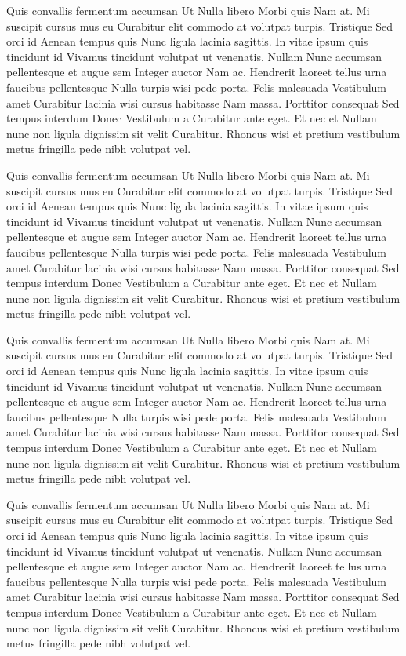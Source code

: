 Quis convallis fermentum accumsan Ut Nulla libero Morbi quis Nam at. Mi suscipit cursus mus eu Curabitur elit commodo at volutpat turpis. Tristique Sed orci id Aenean tempus quis Nunc ligula lacinia sagittis. In vitae ipsum quis tincidunt id Vivamus tincidunt volutpat ut venenatis. Nullam Nunc accumsan pellentesque et augue sem Integer auctor Nam ac. Hendrerit laoreet tellus urna faucibus pellentesque Nulla turpis wisi pede porta. Felis malesuada Vestibulum amet Curabitur lacinia wisi cursus habitasse Nam massa. Porttitor consequat Sed tempus interdum Donec Vestibulum a Curabitur ante eget. Et nec et Nullam nunc non ligula dignissim sit velit Curabitur. Rhoncus wisi et pretium vestibulum metus fringilla pede nibh volutpat vel.

Quis convallis fermentum accumsan Ut Nulla libero Morbi quis Nam at. Mi suscipit cursus mus eu Curabitur elit commodo at volutpat turpis. Tristique Sed orci id Aenean tempus quis Nunc ligula lacinia sagittis. In vitae ipsum quis tincidunt id Vivamus tincidunt volutpat ut venenatis. Nullam Nunc accumsan pellentesque et augue sem Integer auctor Nam ac. Hendrerit laoreet tellus urna faucibus pellentesque Nulla turpis wisi pede porta. Felis malesuada Vestibulum amet Curabitur lacinia wisi cursus habitasse Nam massa. Porttitor consequat Sed tempus interdum Donec Vestibulum a Curabitur ante eget. Et nec et Nullam nunc non ligula dignissim sit velit Curabitur. Rhoncus wisi et pretium vestibulum metus fringilla pede nibh volutpat vel.

Quis convallis fermentum accumsan Ut Nulla libero Morbi quis Nam at. Mi suscipit cursus mus eu Curabitur elit commodo at volutpat turpis. Tristique Sed orci id Aenean tempus quis Nunc ligula lacinia sagittis. In vitae ipsum quis tincidunt id Vivamus tincidunt volutpat ut venenatis. Nullam Nunc accumsan pellentesque et augue sem Integer auctor Nam ac. Hendrerit laoreet tellus urna faucibus pellentesque Nulla turpis wisi pede porta. Felis malesuada Vestibulum amet Curabitur lacinia wisi cursus habitasse Nam massa. Porttitor consequat Sed tempus interdum Donec Vestibulum a Curabitur ante eget. Et nec et Nullam nunc non ligula dignissim sit velit Curabitur. Rhoncus wisi et pretium vestibulum metus fringilla pede nibh volutpat vel.

Quis convallis fermentum accumsan Ut Nulla libero Morbi quis Nam at. Mi suscipit cursus mus eu Curabitur elit commodo at volutpat turpis. Tristique Sed orci id Aenean tempus quis Nunc ligula lacinia sagittis. In vitae ipsum quis tincidunt id Vivamus tincidunt volutpat ut venenatis. Nullam Nunc accumsan pellentesque et augue sem Integer auctor Nam ac. Hendrerit laoreet tellus urna faucibus pellentesque Nulla turpis wisi pede porta. Felis malesuada Vestibulum amet Curabitur lacinia wisi cursus habitasse Nam massa. Porttitor consequat Sed tempus interdum Donec Vestibulum a Curabitur ante eget. Et nec et Nullam nunc non ligula dignissim sit velit Curabitur. Rhoncus wisi et pretium vestibulum metus fringilla pede nibh volutpat vel.